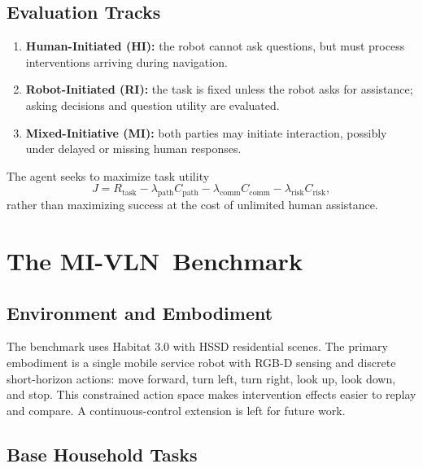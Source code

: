 \documentclass[10pt]{article}
\newcommand{\method}{MI-VLN}
\begin{document}
\subsection{Evaluation Tracks}

\begin{enumerate}[leftmargin=1.6em]
  \item \textbf{Human-Initiated (HI):} the robot cannot ask questions, but
  must process interventions arriving during navigation.
  \item \textbf{Robot-Initiated (RI):} the task is fixed unless the robot asks
  for assistance; asking decisions and question utility are evaluated.
  \item \textbf{Mixed-Initiative (MI):} both parties may initiate interaction,
  possibly under delayed or missing human responses.
\end{enumerate}

The agent seeks to maximize task utility
\begin{equation}
  J=R_{\mathrm{task}}
  -\lambda_{\mathrm{path}}C_{\mathrm{path}}
  -\lambda_{\mathrm{comm}}C_{\mathrm{comm}}
  -\lambda_{\mathrm{risk}}C_{\mathrm{risk}},
\end{equation}
rather than maximizing success at the cost of unlimited human assistance.

\section{The \method\ Benchmark}
\label{sec:benchmark}

\subsection{Environment and Embodiment}

The benchmark uses Habitat 3.0 with HSSD residential scenes. The primary
embodiment is a single mobile service robot with RGB-D sensing and discrete
short-horizon actions: move forward, turn left, turn right, look up, look down,
and stop. This constrained action space makes intervention effects easier to
replay and compare. A continuous-control extension is left for future work.

\subsection{Base Household Tasks}
\end{document}

